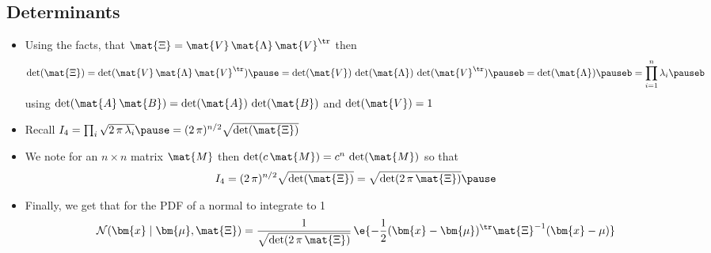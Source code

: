 \begin{slide}
\section[-2]{Determinants}

\begin{PauseHighLight}\small
  \begin{itemize}
  \item Using the facts, that $\mat{\Xi} =
    \mat{V}\,\mat{\Lambda}\,\mat{V}^\tr$ then
    \begin{align*}
          \det(\mat{\Xi}) = \det(\mat{V}\,\mat{\Lambda}\,\mat{V}^\tr) \pause =
          \det(\mat{V})\,\det(\mat{\Lambda})\,\det(\mat{V}^\tr) \pauseb
          = \det(\mat{\Lambda})\pauseb = \prod_{i=1}^n \lambda_i\pauseb
    \end{align*}
    using $\det(\mat{A}\,\mat{B}) =
    \det(\mat{A})\,\det(\mat{B})$\pauseb{} and
    $\det(\mat{V}) =1$\pauseb
  \item Recall $I_4 = \prod_i \sqrt{2\,\pi\,\lambda_i}\pause = (2\,\pi)^{n/2} \sqrt{\det(\mat{\Xi})}$\pauseb
  \item We note for an $n\times n$ matrix $\mat{M}$ then
    $\det(c\,\mat{M})=c^n\,\det(\mat{M})$ so that
    \begin{align*}
      I_4 = (2\,\pi)^{n/2} \sqrt{\det(\mat{\Xi})}= \sqrt{\det(2\,\pi\,\mat{\Xi})}\pause
    \end{align*}
  \item Finally, we get that for the PDF of a normal to integrate to 1
    \begin{align*}
      \mathcal{N}(\bm{x} \mid \bm{\mu}, \mat{\Xi}) =
      \frac{1}{\sqrt{\det(2\,\pi\,\mat{\Xi})}}  \, \e{-\frac{1}{2}  (\bm{x}-\bm{\mu})^\tr \mat{\Xi}^{-1} (\bm{x}-\mu)}
    \end{align*}\pause
  \end{itemize}
\end{PauseHighLight}

\end{slide}


